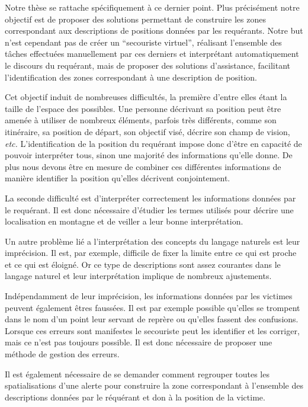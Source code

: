 Notre thèse se rattache spécifiquement à ce dernier point. Plus
précisément notre objectif est de proposer des solutions permettant de
construire les zones correspondant aux descriptions de positions
données par les requérants. Notre but n'est cependant pas de créer un
\enquote{secouriste virtuel}, réalisant l'ensemble des tâches
effectuées manuellement par ces derniers et interprétant
automatiquement le discours du requérant, mais de proposer des
solutions d'assistance, facilitant l'identification des zones
correspondant à une description de position.

Cet objectif induit de nombreuses difficultés, la première d'entre
elles étant la taille de l'espace des possibles. Une personne
décrivant sa position peut être amenée à utiliser de nombreux
éléments, parfois très différents, comme son itinéraire, sa position
de départ, son objectif visé, décrire son champ de vision, \emph{etc.}
L'identification de la position du requérant impose donc d'être en
capacité de pouvoir interpréter tous, sinon une majorité des
informations qu'elle donne. De plus nous devons être en mesure de
combiner ces différentes informations de manière identifier la
position qu'elles décrivent conjointement.

La seconde difficulté est d'interpréter correctement les informations
données par le requérant. Il est donc nécessaire d'étudier les termes
utilisés pour décrire une localisation en montagne et de veiller a
leur bonne interprétation.

Un autre problème lié a l'interprétation des concepts du langage
naturels est leur imprécision. Il est, par exemple, difficile de fixer
la limite entre ce qui est proche et ce qui est éloigné. Or ce type de
descriptions sont assez courantes dans le langage naturel et leur
interprétation implique de nombreux ajustements.

Indépendamment de leur imprécision, les informations données par les
victimes peuvent également êtres faussées. Il est par exemple possible
qu'elles se trompent dans le nom d'un point leur servant de reprère ou
qu'elles fassent des confusions. Lorsque ces erreurs sont manifestes
le secouriste peut les identifier et les corriger, mais ce n'est pas
toujours possible. Il est donc nécessaire de proposer une méthode de
gestion des erreurs.



Il est également nécessaire de se demander comment regrouper toutes
les spatialisations d'une alerte pour construire la zone correspondant
à l'ensemble des descriptions données par le réquérant et don à la
position de la victime.








